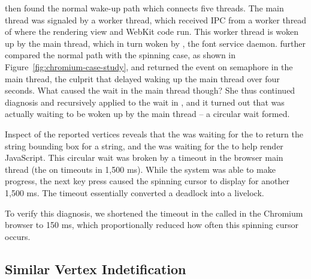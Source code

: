 \xxx then found the normal wake-up path which connects five threads.
The  main thread was signaled by a  worker thread, which
received IPC from a worker thread of  where the rendering view
and WebKit code run. This worker thread is woken up by the  main
thread, which in turn woken by , the font service daemon. \xxx further
compared the normal path with the spinning case, as shown
in Figure~\ref{fig:chromium-case-study}, and returned the  event
on semaphore in the  main thread, the culprit that delayed
waking up the  main thread over four seconds. What caused the wait in the
 main thread though? She thus continued diagnosis and recursively
applied \xxx to the wait in , and it turned out that  was
actually waiting to be woken up by the  main thread -- a circular wait formed.



Inspect of the reported vertices reveals that the  was waiting for
the  to return the string bounding box for a string, and the
 was waiting for the  to help render JavaScript. This
circular wait was broken by a timeout in the browser main thread (the 
on  timeouts in 1,500 ms). While the system was
able to make progress, the next key press caused the spinning cursor to display
for another 1,500 ms. The timeout essentially converted a deadlock into a
livelock.

To verify this diagnosis, we shortened the timeout in the
 called in the Chromium browser to 150
ms, which proportionally reduced how often this spinning cursor
occurs.

\subsection{Similar Vertex Indetification}

